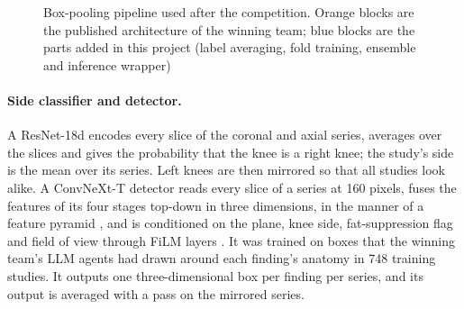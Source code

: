 \begin{figure}[htbp]
\centering{}
\caption[Box-pooling pipeline used after the competition]{Box-pooling pipeline used after the competition. Orange blocks are the published architecture of the winning team; blue blocks are the parts added in this project (label averaging, fold training, ensemble and inference wrapper)}
\label{fig:bp}
\end{figure}

\paragraph{Side classifier and detector.} A ResNet-18d \cite{he2016resnet,he2019bagoftricks} encodes every slice of the coronal and axial series, averages over the slices and gives the probability that the knee is a right knee; the study's side is the mean over its series. Left knees are then mirrored so that all studies look alike. A ConvNeXt-T detector reads every slice of a series at 160 pixels, fuses the features of its four stages top-down in three dimensions, in the manner of a feature pyramid \cite{lin2017fpn}, and is conditioned on the plane, knee side, fat-suppression flag and field of view through FiLM layers \cite{perez2018film}. It was trained on boxes that the winning team's LLM agents had drawn around each finding's anatomy in 748 training studies. It outputs one three-dimensional box per finding per series, and its output is averaged with a pass on the mirrored series.

